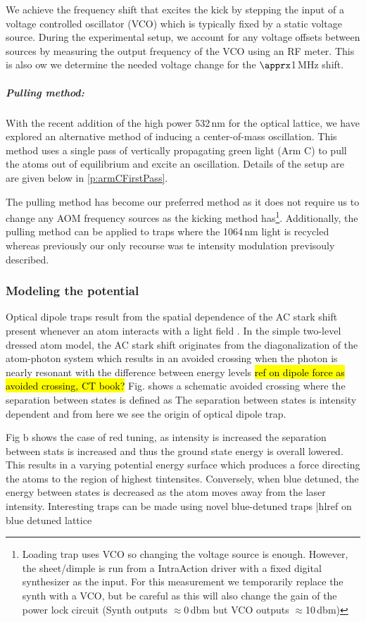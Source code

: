 We achieve the frequency shift that excites the kick by stepping the input of a voltage controlled oscillator (VCO) which is typically fixed by a static voltage source.
During the experimental setup, we account for any voltage offsets between sources by measuring the output frequency of the VCO using an RF meter.
This is also ow we determine the needed voltage change for the $\apprx$1\,MHz shift.

\subparagraph{Pulling method:}
With the recent addition of the high power 532\,nm for the optical lattice, we have explored an alternative method of inducing a center-of-mass oscillation. 
This method uses a single pass of vertically propagating green light (Arm C) to pull the atoms out of equilibrium and excite an oscillation.
Details of the setup are are given below in \ref{p:armCFirstPass}.

The pulling method has become our preferred method as it does not require us to change any AOM frequency sources as the kicking method has\footnote{Loading trap uses VCO so changing the voltage source is enough. However, the sheet/dimple is run from a IntraAction driver with a fixed digital synthesizer as the input. For this measurement we temporarily replace the synth with a VCO, but be careful as this will also change the gain of the power lock circuit (Synth outputs $\approx$0\,dbm but VCO outputs $\approx$10\,dbm)}.
Additionally, the pulling method can be applied to traps where the 1064\,nm light is recycled whereas previously our only recourse was te intensity modulation previsouly described.

\subsubsection{Modeling the potential} \label{sssec:1064_modeling}
Optical dipole traps result from the spatial dependence of the AC stark shift present whenever an atom interacts with a light field \cite{Grimm1999a}.
In the simple two-level dressed atom model, the AC stark shift originates from the diagonalization of the atom-photon system which results in an avoided crossing when the photon is nearly resonant with the difference between energy levels \hl{ref on dipole force as avoided crossing, CT book?}
Fig. shows a schematic avoided crossing where the separation between states is defined as %
The separation between states is intensity dependent and from here we see the origin of optical dipole trap.

Fig b shows the case of red tuning, as intensity is increased the separation between stats is increased and thus the ground state energy is overall lowered.
This results in a varying potential energy surface which produces a force directing the atoms to the region of highest tintensites.
Conversely, when blue detuned, the energy between states is decreased as the atom moves away from the laser intensity. 
Interesting traps can be made using novel blue-detuned traps |hl{ref on blue detuned lattice}



